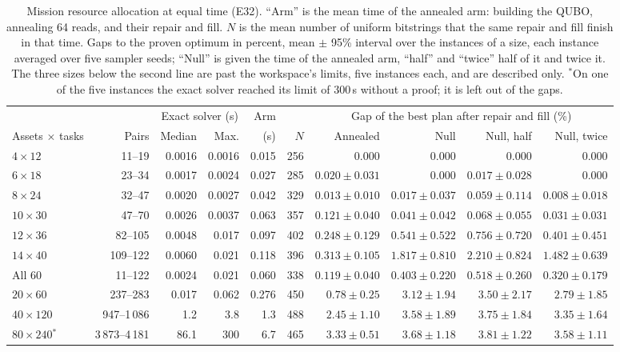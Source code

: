 \documentclass[11pt,a4paper]{article}
\begin{document}
\begin{table}[H]
\centering\footnotesize\setlength{\tabcolsep}{1.8pt}
\begin{tabular}{lrrrrrrrrr}
\toprule
 & & \multicolumn{2}{c}{Exact solver (s)} & Arm & & \multicolumn{4}{c}{Gap of the best plan after repair and fill (\%)} \\
Assets $\times$ tasks & Pairs & Median & Max. & (s) & $N$ & Annealed & Null & Null, half & Null, twice \\
\midrule
$4 \times 12$ & 11--19 & 0.0016 & 0.0016 & 0.015 & 256 & $0.000$ & $0.000$ & $0.000$ & $0.000$ \\
$6 \times 18$ & 23--34 & 0.0017 & 0.0024 & 0.027 & 285 & $0.020 \pm 0.031$ & $0.000$ & $0.017 \pm 0.028$ & $0.000$ \\
$8 \times 24$ & 32--47 & 0.0020 & 0.0027 & 0.042 & 329 & $0.013 \pm 0.010$ & $0.017 \pm 0.037$ & $0.059 \pm 0.114$ & $0.008 \pm 0.018$ \\
$10 \times 30$ & 47--70 & 0.0026 & 0.0037 & 0.063 & 357 & $0.121 \pm 0.040$ & $0.041 \pm 0.042$ & $0.068 \pm 0.055$ & $0.031 \pm 0.031$ \\
$12 \times 36$ & 82--105 & 0.0048 & 0.017 & 0.097 & 402 & $0.248 \pm 0.129$ & $0.541 \pm 0.522$ & $0.756 \pm 0.720$ & $0.401 \pm 0.451$ \\
$14 \times 40$ & 109--122 & 0.0060 & 0.021 & 0.118 & 396 & $0.313 \pm 0.105$ & $1.817 \pm 0.810$ & $2.210 \pm 0.824$ & $1.482 \pm 0.639$ \\
\midrule
All 60 & 11--122 & 0.0024 & 0.021 & 0.060 & 338 & $0.119 \pm 0.040$ & $0.403 \pm 0.220$ & $0.518 \pm 0.260$ & $0.320 \pm 0.179$ \\
\midrule
$20 \times 60$ & 237--283 & 0.017 & 0.062 & 0.276 & 450 & $0.78 \pm 0.25$ & $3.12 \pm 1.94$ & $3.50 \pm 2.17$ & $2.79 \pm 1.85$ \\
$40 \times 120$ & 947--1\,086 & 1.2 & 3.8 & 1.3 & 488 & $2.45 \pm 1.10$ & $3.58 \pm 1.89$ & $3.75 \pm 1.84$ & $3.35 \pm 1.64$ \\
$80 \times 240$$^\ast$ & 3\,873--4\,181 & 86.1 & 300 & 6.7 & 465 & $3.33 \pm 0.51$ & $3.68 \pm 1.18$ & $3.81 \pm 1.22$ & $3.58 \pm 1.11$ \\
\bottomrule
\end{tabular}
\caption{Mission resource allocation at equal time (E32). ``Arm'' is the
mean time of the annealed arm: building the QUBO, annealing 64 reads, and
their repair and fill. $N$ is the mean number of uniform bitstrings that
the same repair and fill finish in that time. Gaps to the proven optimum in
percent, mean $\pm$ 95\% interval over the instances of a size, each
instance averaged over five sampler seeds; ``Null'' is given the time of
the annealed arm, ``half'' and ``twice'' half of it and twice it. The three sizes below the second
line are past the workspace's limits, five instances each, and are
described only. $^\ast$On one of the five instances the exact solver
reached its limit of 300\,s without a proof; it is left out of the gaps.}
\label{tab:mission-time}
\end{table}
\end{document}
